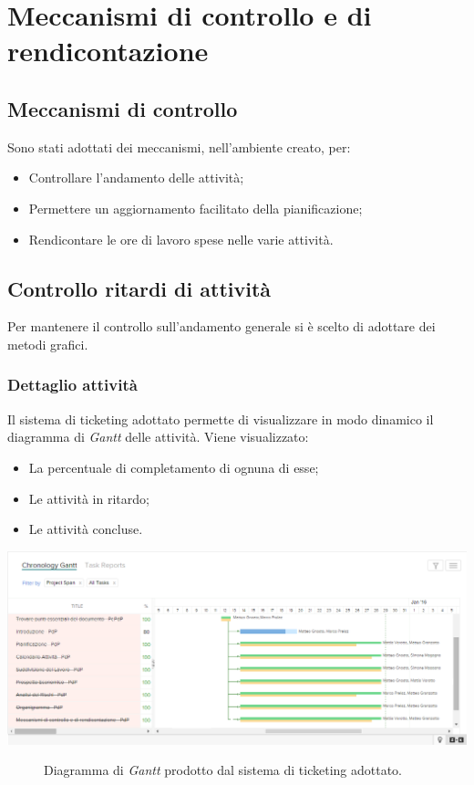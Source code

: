 \newpage
\section{Meccanismi di controllo e di rendicontazione}
	\subsection{Meccanismi di controllo} Sono stati adottati dei meccanismi, nell'ambiente creato, per:
	\begin{itemize}
		\item Controllare l'andamento delle attività;
		\item Permettere un aggiornamento facilitato della pianificazione;
		\item Rendicontare le ore di lavoro spese nelle varie attività.
	\end{itemize}
	\subsection{Controllo ritardi di attività}  Per mantenere il controllo sull'andamento generale si è scelto di adottare dei metodi grafici.
		\subsubsection{Dettaglio attività} Il sistema di ticketing adottato permette di visualizzare in modo dinamico il diagramma di  \textit{Gantt} delle attività. Viene visualizzato:
		\begin{itemize}
			\item La percentuale di completamento di ognuna di esse;
			\item Le attività in ritardo;
			\item Le attività concluse.
		\end{itemize}
		\begin{center}
			\includegraphics[keepaspectratio = true, width=16cm]{immagini/PdP_ZohoGantt.png}
		\end{center}
		\begin{figure}[h]
			\caption{Diagramma di \textit{Gantt} prodotto dal sistema di ticketing adottato.}\label{etichetta}
		\end{figure}
